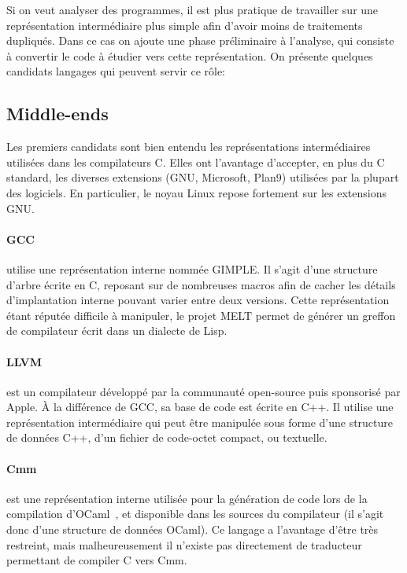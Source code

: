 Si on veut analyser des programmes, il est plus pratique de travailler sur une
représentation intermédiaire plus simple afin d'avoir moins de traitements
dupliqués. Dans ce cas on ajoute une phase préliminaire à l'analyse, qui
consiste à convertir le code à étudier vers cette représentation. On présente
quelques candidats langages qui peuvent servir ce rôle:

\subsection*{Middle-ends}

Les premiers candidats sont bien entendu les représentations intermédiaires
utilisées dans les compilateurs C. Elles ont l'avantage d'accepter, en plus du C
standard, les diverses extensions (GNU, Microsoft, Plan9) utilisées par la
plupart des logiciels. En particulier, le noyau Linux repose fortement sur les
extensions GNU.\@

\paragraph{GCC} utilise une représentation interne nommée
GIMPLE\cite{gcc-gimple}. Il s'agit d'une structure d'arbre écrite en C, reposant
sur de nombreuses macros afin de cacher les détails d'implantation interne
pouvant varier entre deux versions. Cette représentation étant réputée difficile
à manipuler, le projet MELT\cite{gcc-melt} permet de générer un greffon de
compilateur écrit dans un dialecte de Lisp.

\paragraph{LLVM}\cite{llvm-pres} est un compilateur développé par la communauté
open-source puis sponsorisé par Apple. À la différence de GCC, sa base de code
est écrite en C++. Il utilise une représentation intermédiaire qui peut être
manipulée sous forme d'une structure de données C++, d'un fichier de code-octet
compact, ou textuelle.

\paragraph{Cmm} est une représentation interne utilisée pour la génération de
code lors de la compilation d'OCaml~, et disponible dans les sources
du compilateur (il s'agit donc d'une structure de données OCaml). Ce langage a
l'avantage d'être très restreint, mais malheureusement il n'existe pas
directement de traducteur permettant de compiler C vers Cmm.


